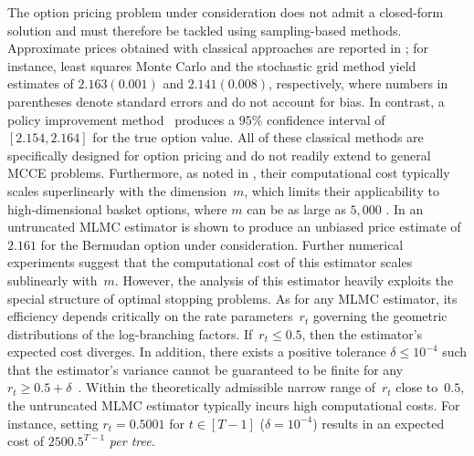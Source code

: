 \documentclass[11pt]{article}
\begin{document}
The option pricing problem under consideration does not admit a closed-form solution and must therefore be tackled using sampling-based methods. Approximate prices obtained with classical approaches are reported in \cite[Table~4]{jain2012pricing}; for instance, least squares Monte Carlo and the stochastic grid method yield estimates of $2.163(0.001)$ and $2.141(0.008)$, respectively, where numbers in parentheses denote standard errors and do not account for bias. In contrast, a policy improvement method~\cite{bender2006policy} produces a $95\%$ confidence interval of $[2.154,2.164]$ for the true option value. All of these classical methods are specifically designed for option pricing and do not readily extend to general MCCE problems. Furthermore, as noted in \cite{zhou2022unbiased}, their computational cost typically scales superlinearly with the dimension~$m$, which limits their applicability to high-dimensional basket options, where $m$ can be as large as $5{,}000$ \cite{becker2021solving}. In \cite{zhou2022unbiased} an untruncated MLMC estimator is shown to produce an unbiased price estimate of $2.161$ for the Bermudan option under consideration. Further numerical experiments suggest that the computational cost of this estimator scales sublinearly with~$m$. However, the analysis of this estimator heavily exploits the special structure of optimal stopping problems. As for any MLMC estimator, its efficiency depends critically on the rate parameters~$r_t$ governing the geometric distributions of the log-branching factors. If~$r_t\leq0.5$, then the estimator's expected cost diverges. In addition, there exists a positive tolerance $\delta\le 10^{-4}$ such that the estimator’s variance cannot be guaranteed to be finite for any $r_t\ge 0.5+\delta$~\cite[Theorem 2]{zhou2022unbiased}. Within the theoretically admissible narrow range of~$r_t$ close to~$0.5$, the untruncated MLMC estimator typically incurs high computational costs. For instance, setting $r_t=0.5001$ for $t\in[T-1]$ ($\delta=10^{-4}$) results in an expected cost of $2500.5^{T-1}$ \emph{per tree}.
\end{document}
